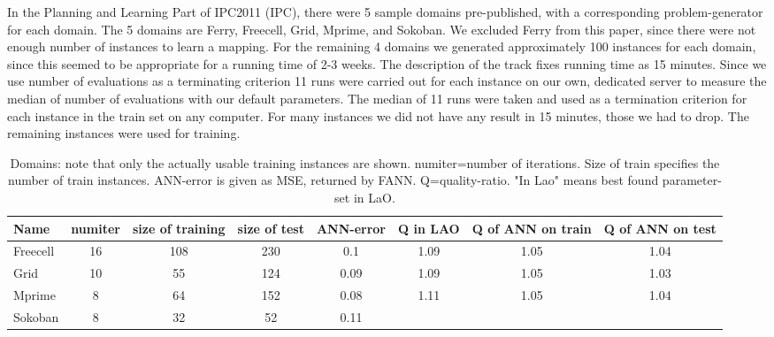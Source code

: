 \documentclass{acm_proc_article-sp}
\begin{document}
In the Planning and Learning Part of IPC2011 (IPC), there were 5 sample domains pre-published, with a corresponding problem-generator for each domain. The 5 domains are Ferry, Freecell, Grid, Mprime, and Sokoban. We excluded Ferry from this paper, since there were not enough number of instances to learn a mapping. For the remaining 4 domains we generated approximately 100 instances for each domain, since this seemed to be appropriate for a running time of 2-3 weeks. The description of the track fixes running time as 15 minutes. Since we use number of evaluations as a terminating criterion 11 runs were carried out for each instance on our own, dedicated server to measure the median of number of evaluations with our default parameters. The median of 11 runs were taken and used as a termination criterion for each instance in the train set on any computer. For many instances we did not have any result in 15 minutes, those we had to drop. The remaining instances were used for training. 

 \begin{table*}[ht]
\centering

\begin{tabular}{l c c c c c c c}
\hline\hline
Name & numiter & size of training & size of test &  ANN-error & Q in LAO & Q of ANN on train & Q of ANN on test \\ 
\hline
Freecell& 16 & 108 & 230 & 0.1 & 1.09 & 1.05 & 1.04  \\
Grid & 10 & 55 & 124 & 0.09 & 1.09 & 1.05 & 1.03  \\
Mprime & 8 & 64 & 152 & 0.08 & 1.11 & 1.05 & 1.04   \\
Sokoban & 8 & 32 & 52 & 0.11 & 	 &  &   \\
\hline
\end{tabular}
\caption{Domains: note that only the actually usable training instances are shown. numiter=number of iterations. Size of train specifies the number of train instances. ANN-error is given as MSE, returned by FANN. Q=quality-ratio. "In Lao" means best found parameter-set in LaO.}
\label{table:domains}
\end{table*} 
\end{document}
